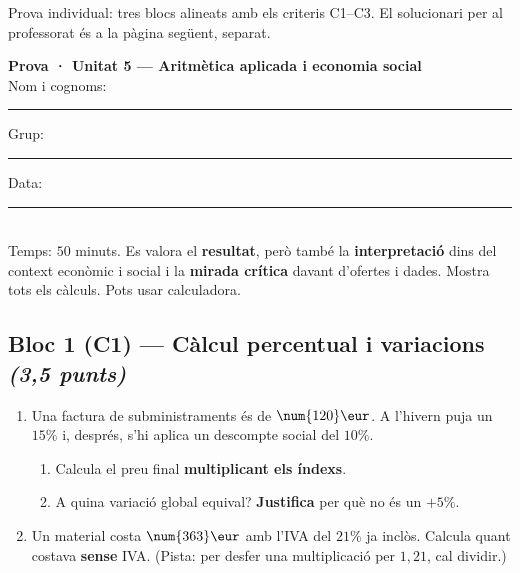 %
{Prova individual: tres blocs alineats amb els criteris C1–C3. El solucionari per al professorat és a la pàgina següent, separat.}

\begin{tcolorbox}[colback=white, colframe=udnavy, boxrule=0.8pt, arc=2pt,
  left=8pt, right=8pt, top=6pt, bottom=6pt]
\textbf{Prova · Unitat 5 — Aritmètica aplicada i economia social}\\[4pt]
Nom i cognoms: \rule{6.5cm}{0.4pt} \quad Grup: \rule{1.6cm}{0.4pt} \quad Data: \rule{2.2cm}{0.4pt}\\[6pt]
\small Temps: $50$ minuts. Es valora el \textbf{resultat}, però també la
\textbf{interpretació} dins del context econòmic i social i la \textbf{mirada crítica}
davant d'ofertes i dades. Mostra tots els càlculs. Pots usar calculadora.
\end{tcolorbox}

\vspace{0.4em}

\subsection*{Bloc 1 (C1) — Càlcul percentual i variacions \hfill \normalfont\itshape (3,5 punts)}

\begin{enumerate}[label=\textbf{\arabic*.}, leftmargin=2em, itemsep=8pt]
  \item Una factura de subministraments és de $\num{120}\eur$. A l'hivern puja un
        $15\%$ i, després, s'hi aplica un descompte social del $10\%$.
    \begin{enumerate}[label=\alph*), leftmargin=1.6em, topsep=2pt]
      \item Calcula el preu final \textbf{multiplicant els índexs}.
      \item A quina variació global equival? \textbf{Justifica} per què no és un $+5\%$.
    \end{enumerate}
  \item Un material costa $\num{363}\eur$ amb l'IVA del $21\%$ ja inclòs. Calcula quant
        costava \textbf{sense} IVA. (Pista: per desfer una multiplicació per $1,21$, cal
        dividir.)
\end{enumerate}

